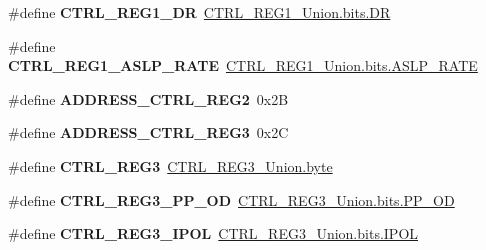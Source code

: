 \begin{DoxyCompactItemize}
\item 
\hypertarget{group__accel__module_gaed6eca0a6b7cb800d7de4400a52cf556}{}\#define {\bfseries C\+T\+R\+L\+\_\+\+R\+E\+G1\+\_\+\+D\+R}~\hyperlink{accel_8c_a2c3e455107759b4d70b168e43fea4219}{C\+T\+R\+L\+\_\+\+R\+E\+G1\+\_\+\+Union.\+bits.\+D\+R}\label{group__accel__module_gaed6eca0a6b7cb800d7de4400a52cf556}

\item 
\hypertarget{group__accel__module_ga7245fe0e235bbe17a78655e0344dfd37}{}\#define {\bfseries C\+T\+R\+L\+\_\+\+R\+E\+G1\+\_\+\+A\+S\+L\+P\+\_\+\+R\+A\+T\+E}~\hyperlink{accel_8c_a15d72faada7955cc863ee2454e499b1b}{C\+T\+R\+L\+\_\+\+R\+E\+G1\+\_\+\+Union.\+bits.\+A\+S\+L\+P\+\_\+\+R\+A\+T\+E}\label{group__accel__module_ga7245fe0e235bbe17a78655e0344dfd37}

\item 
\hypertarget{group__accel__module_ga5ac89f21caba0366745a91bca43d6243}{}\#define {\bfseries A\+D\+D\+R\+E\+S\+S\+\_\+\+C\+T\+R\+L\+\_\+\+R\+E\+G2}~0x2\+B\label{group__accel__module_ga5ac89f21caba0366745a91bca43d6243}

\item 
\hypertarget{group__accel__module_gaa4a445e2b5c3df9162cc6147c1572e17}{}\#define {\bfseries A\+D\+D\+R\+E\+S\+S\+\_\+\+C\+T\+R\+L\+\_\+\+R\+E\+G3}~0x2\+C\label{group__accel__module_gaa4a445e2b5c3df9162cc6147c1572e17}

\item 
\hypertarget{group__accel__module_gacdb673970b82f2380da68c9e8d1dc5c6}{}\#define {\bfseries C\+T\+R\+L\+\_\+\+R\+E\+G3}~\hyperlink{accel_8c_a96f44d20f1dbf1c8785a7bc99a46164c}{C\+T\+R\+L\+\_\+\+R\+E\+G3\+\_\+\+Union.\+byte}\label{group__accel__module_gacdb673970b82f2380da68c9e8d1dc5c6}

\item 
\hypertarget{group__accel__module_gaaf149de4e9994db16fc38f1c37a1b086}{}\#define {\bfseries C\+T\+R\+L\+\_\+\+R\+E\+G3\+\_\+\+P\+P\+\_\+\+O\+D}~\hyperlink{accel_8c_a1a8bacd733e6410ea0fdbfea65be0682}{C\+T\+R\+L\+\_\+\+R\+E\+G3\+\_\+\+Union.\+bits.\+P\+P\+\_\+\+O\+D}\label{group__accel__module_gaaf149de4e9994db16fc38f1c37a1b086}

\item 
\hypertarget{group__accel__module_ga4387f4aa195e12686a1d899fc05e8122}{}\#define {\bfseries C\+T\+R\+L\+\_\+\+R\+E\+G3\+\_\+\+I\+P\+O\+L}~\hyperlink{accel_8c_a60eda525b85b5f80b3c09d4633165705}{C\+T\+R\+L\+\_\+\+R\+E\+G3\+\_\+\+Union.\+bits.\+I\+P\+O\+L}\label{group__accel__module_ga4387f4aa195e12686a1d899fc05e8122}


\end{DoxyCompactItemize}
